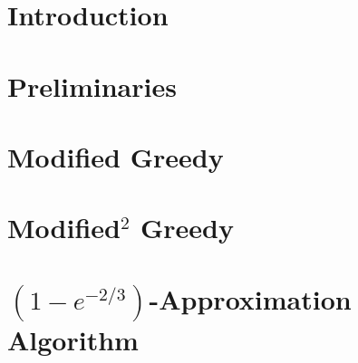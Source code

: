 \section{Introduction}

\section{Preliminaries}

\section{Modified Greedy}

\section{\texorpdfstring{Modified$^2$ Greedy}{Modified\^{}2 Greedy}}

\section{\texorpdfstring{$(1 - e^{-2/3})$}{(1 - e\^-2/3)}-Approximation Algorithm}
